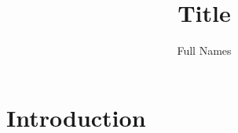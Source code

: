 \documentclass[cover]{ams-project}
\title{Title}
\author{Full Names}
\begin{document}
\maketitle

\begin{abstract}
\Blindtext
\end{abstract}

\clearpage
\tableofcontents
\cleardoublepage

\section[Introduction]{Introduction}
\Blindtext
\cite{RaspiPower}


\end{document}

